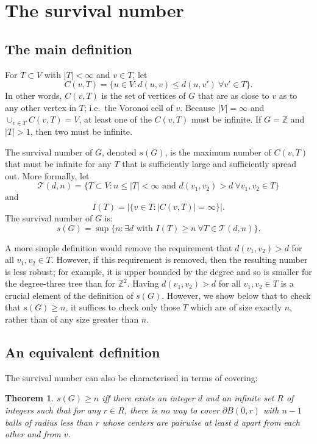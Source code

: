 \documentclass[11pt]{article}
\newtheorem{thm}{Theorem}
\newcommand{\Z}{\mathbb{Z}}
\newcommand{\T}{\mathcal{T}}
\begin{document}
\section{The survival number }
\label{sec:survival}

\subsection{The main definition}
For $T \subset V$ with $|T| < \infty$ and $v \in T$, let 
$$C(v, T) = \{u \in V : d(u,v) \leq d(u, v')\ \forall v' \in T\}.$$ 
In other words, $C(v,T)$ is the set of vertices of $G$ that are as close to $v$ as to any other vertex in $T$; i.e.\ the Voronoi cell of $v$. Because $|V|= \infty$ and $\cup_{v \in T} C(v,T) = V$, at least one of the $C(v,T)$ must be infinite. If $G = \Z$ and $|T|>1$, then two must be infinite.

The survival number of $G$, denoted $s(G)$, is the maximum number of $C(v,T)$ that must be infinite for any $T$ that is sufficiently large and sufficiently spread out. More formally, let 
$$\T(d,n) = \{T \subset V: n \leq |T| < \infty \mbox{ and }d(v_1, v_2)>d\ \forall v_1, v_2 \in T\}$$ 
and
$$I(T) = \bigl|\{v \in T : |C(v,T)| = \infty\}\bigr|.$$
The survival number of $G$ is:
$$s(G) = \sup \{n : \exists d \mbox{ with } I(T) \geq n\ \forall T\in \mathcal{T} (d,n)\}.$$

A more simple definition would remove the requirement that $d(v_1, v_2) > d$ for all $v_1, v_2 \in T$. However, if this requirement is removed, then the resulting number is less robust; for example, it is upper bounded by the degree and so is smaller for the degree-three tree than for $\Z^2$. Having $d(v_1, v_2)>d$ for all $v_1, v_2 \in T$ is a crucial element of the definition of $s(G)$. However, we show below that to check that $s(G) \geq n$, it suffices to check only those $T$ which are of size exactly $n$, rather than of any size greater than $n$.


\subsection{An equivalent definition}
The survival number can also be characterised in terms of covering:

\begin{thm} \label{equiv2} 
$s(G) \geq n$ iff there exists an integer $d$ and an infinite set $R$ of integers such that for any $r \in R$, there is no way to cover $\partial B(0,r)$ with $n-1$ balls of radius less than $r$ whose centers are pairwise at least $d$ apart from each other and from $v$. \end{thm}
\end{document}

